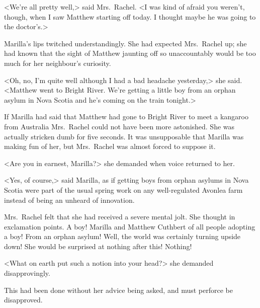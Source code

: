 <We're all pretty well,> said Mrs.~Rachel. <I was kind of afraid you weren't, though, when I saw Matthew starting off today. I thought maybe he was going to the doctor's.>

Marilla's lips twitched understandingly. She had expected Mrs.~Rachel up; she had known that the sight of Matthew jaunting off so unaccountably would be too much for her neighbour's curiosity.

<Oh, no, I'm quite well although I had a bad headache yesterday,> she said. <Matthew went to Bright River. We're getting a little boy from an orphan asylum in Nova Scotia and he's coming on the train tonight.>

If Marilla had said that Matthew had gone to Bright River to meet a kangaroo from Australia Mrs.~Rachel could not have been more astonished. She was actually stricken dumb for five seconds. It was unsupposable that Marilla was making fun of her, but Mrs.~Rachel was almost forced to suppose it.

<Are you in earnest, Marilla?> she demanded when voice returned to her.

<Yes, of course,> said Marilla, as if getting boys from orphan asylums in Nova Scotia were part of the usual spring work on any well-regulated Avonlea farm instead of being an unheard of innovation.

Mrs.~Rachel felt that she had received a severe mental jolt. She thought in exclamation points. A boy! Marilla and Matthew Cuthbert of all people adopting a boy! From an orphan asylum! Well, the world was certainly turning upside down! She would be surprised at nothing after this! Nothing!

<What on earth put such a notion into your head?> she demanded disapprovingly.

This had been done without her advice being asked, and must perforce be disapproved.

